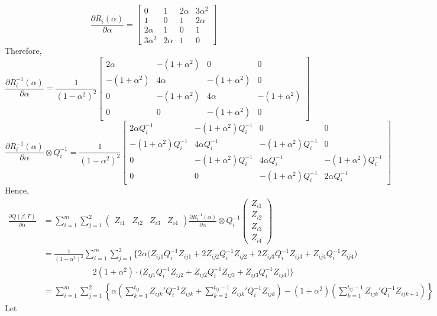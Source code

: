 \documentclass[
]{aft}
\begin{document}
\[
\frac{\partial R_i(\alpha)}{\partial \alpha}= 
\begin{bmatrix}
0 & 1 & 2\alpha & 3\alpha^2\\
1 & 0 & 1 & 2\alpha\\
2\alpha & 1 & 0 & 1\\
3\alpha^2 & 2\alpha & 1 & 0
\end{bmatrix}
\] Therefore, \[
\frac{\partial{R_i^{-1}(\alpha)}}{\partial \alpha}= 
\frac{1}{(1-\alpha^2)^2}
\begin{bmatrix}
2\alpha & -(1+\alpha^2) & 0 & 0\\
-(1+\alpha^2) & 4\alpha & -(1+\alpha^2) & 0\\
0 & -(1+\alpha^2) & 4\alpha & -(1+\alpha^2)\\
0 & 0 & -(1+\alpha^2) & 0
\end{bmatrix}
\] \[
\frac{\partial{R_i^{-1}(\alpha)}}{\partial \alpha}\otimes Q_i^{-1} = 
\frac{1}{(1-\alpha^2)^2}
\begin{bmatrix}
2\alpha Q_i^{-1} & -(1+\alpha^2) Q_i^{-1} & 0 & 0\\
-(1+\alpha^2) Q_i^{-1} & 4\alpha Q_i^{-1} & -(1+\alpha^2) Q_i^{-1} & 0\\
0 & -(1+\alpha^2) Q_i^{-1} & 4\alpha Q_i^{-1} & -(1+\alpha^2) Q_i^{-1}\\
0 & 0 & -(1+\alpha^2) Q_i^{-1} & 2\alpha Q_i^{-1}
\end{bmatrix}
\] Hence, \[
\begin{aligned}
\frac{\partial Q(\beta, \Gamma)}{\partial \alpha} &= 
\sum_{i=1}^m \sum_{j=1}^2 
\begin{pmatrix}
Z_{i1} & Z_{i2} & Z_{i3} & Z_{i4} 
\end{pmatrix}
\frac{\partial{R_i^{-1}(\alpha)}}{\partial \alpha}\otimes Q_i^{-1}
\begin{pmatrix}
Z_{i1} \\ Z_{i2} \\ Z_{i3} \\ Z_{i4} 
\end{pmatrix}\\
&= \frac{1}{(1-\alpha^2)^2} \sum_{i=1}^m \sum_{j=1}^2 
\Big\{2\alpha \Big(Z_{ij1}Q_i^{-1}Z_{ij1} + 2Z_{ij2}Q_i^{-1}Z_{ij2}+  2Z_{ij3}Q_i^{-1}Z_{ij3}+Z_{ij4}Q_i^{-1}Z_{ij4}\Big)\\
& \quad \quad \quad \quad \quad\quad 2(1+\alpha^2)\cdot 
\Big(Z_{ij1}Q_i^{-1}Z_{ij2}+Z_{ij2}Q_i^{-1}Z_{ij3}+Z_{ij3}Q_i^{-1}Z_{ij4}\Big)
\Big\}\\
&= \sum_{i=1}^m \sum_{j=1}^2 \left\{\alpha 
\left(\sum_{k=1}^{t_{ij}} Z_{ijk}'Q_i^{-1} Z_{ijk} + \sum_{k=2}^{t_{ij} - 1}Z_{ijk}'Q_i^{-1} Z_{ijk}\right) - (1+\alpha^2)\left(\sum_{k=1}^{t_{ij} - 1}Z_{ijk}'Q_i^{-1}Z_{ijk+1}\right) \right\}
\end{aligned}
\] Let
\end{document}
